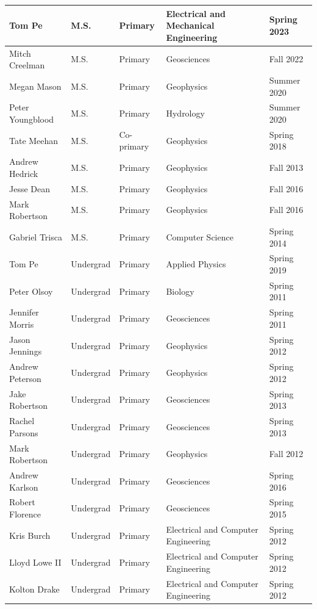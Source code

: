 \documentclass[11pt]{article}
\begin{document}
\begin{table}[!htbp]
\begin{tabular}{|l|l|l|l|l|}
Tom Pe & M.S. & Primary & Electrical and Mechanical Engineering & Spring 2023 \\ \hline
Mitch Creelman & M.S. & Primary & Geosciences & Fall 2022 \\ \hline
Megan Mason & M.S. & Primary & Geophysics & Summer 2020 \\ \hline
Peter Youngblood & M.S. & Primary & Hydrology & Summer 2020 \\ \hline
Tate Meehan & M.S. & Co-primary & Geophysics & Spring 2018 \\ \hline
Andrew Hedrick & M.S. & Primary & Geophysics & Fall 2013 \\ \hline
Jesse Dean & M.S. & Primary & Geophysics & Fall 2016 \\ \hline
Mark Robertson & M.S. & Primary & Geophysics & Fall 2016 \\ \hline
Gabriel Trisca & M.S. & Primary & Computer Science & Spring 2014 \\ \hline
Tom Pe & Undergrad & Primary & Applied Physics & Spring 2019 \\ \hline
Peter Olsoy & Undergrad & Primary & Biology & Spring 2011 \\ \hline
Jennifer Morris & Undergrad & Primary & Geosciences & Spring 2011 \\ \hline
Jason Jennings & Undergrad & Primary & Geophysics & Spring 2012 \\ \hline
Andrew Peterson & Undergrad & Primary & Geophysics & Spring 2012 \\ \hline
Jake Robertson & Undergrad & Primary & Geosciences & Spring 2013 \\ \hline
Rachel Parsons & Undergrad & Primary & Geosciences & Spring 2013 \\ \hline
Mark Robertson & Undergrad & Primary & Geophysics & Fall 2012 \\ \hline
Andrew Karlson & Undergrad & Primary & Geosciences & Spring 2016 \\ \hline
Robert Florence & Undergrad & Primary & Geosciences & Spring 2015 \\ \hline
Kris Burch & Undergrad & Primary & Electrical and Computer Engineering & Spring 2012 \\ \hline
Lloyd Lowe II & Undergrad & Primary & Electrical and Computer Engineering & Spring 2012 \\ \hline
Kolton Drake & Undergrad & Primary & Electrical and Computer Engineering & Spring 2012 \\ \hline
\end{tabular}
\end{table}
\end{document}
